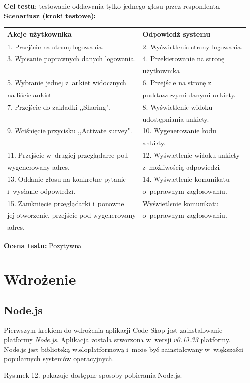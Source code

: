 \documentclass[8pt,a4paper,notitlepage]{article}
\begin{document}
\textbf{Cel testu}: testowanie oddawania tylko jednego głosu przez respondenta. \\
\textbf{Scenariusz (kroki testowe):}
\begin{center}
  \begin{tabular}{| l| l|}
    \hline
    
 \textbf{Akcje użytkownika} &  \textbf{Odpowiedź systemu} \\  \hline
1. Przejście na stronę logowania. & 2. Wyświetlenie strony logowania. \\ 
3. Wpisanie poprawnych danych logowania. & 4. Przekierowanie na stronę  \\ 
& użytkownika \\ 
5. Wybranie jednej z~ankiet widocznych & 6. Przejście na stronę z~ \\  na liście ankiet &  podstawowymi danymi ankiety. \\
7. Przejście do zakładki ,,Sharing". & 8. Wyświetlenie widoku  \\ & udostępniania ankiety. \\
9. Wciśnięcie przycisku ,,Activate survey". & 10. Wygenerowanie kodu \\ & ankiety. \\
11. Przejście w~drugiej przeglądarce pod & 12. Wyświetlenie widoku ankiety  \\  wygenerowany adres. & z~możliwością odpowiedzi. \\
13. Oddanie głosu na konkretne pytanie & 14. Wyświetlenie komunikatu \\  i~wysłanie odpowiedzi. &  o~poprawnym zagłosowaniu. \\
15. Zamknięcie przeglądarki i~ponowne & Wyświetlenie komunikatu  \\  jej otworzenie, przejście pod wygenerowany & o~poprawnym zagłosowaniu. \\  adres. & \\
\hline
 
  \end{tabular}
\end{center}

\textbf{Ocena testu: } Pozytywna

\newpage
\section {Wdrożenie}

\subsection{Node.js}
Pierwszym krokiem do wdrożenia aplikacji Code-Shop jest zainstalowanie platformy \textit{Node.js}. Aplikacja została stworzona w~wersji \textit{v0.10.33} platformy. Node.js jest biblioteką wieloplatformową i~może być zainstalowany w~większości popularnych systemów operacyjnych.
\par Rysunek 12. pokazuje dostępne sposoby pobierania Node.js.
\end{document}
